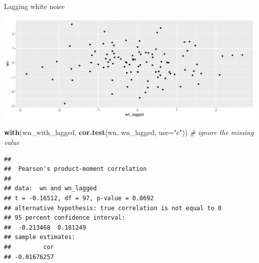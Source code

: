 \documentclass[
  ignorenonframetext,
]{beamer}
\newenvironment{Shaded}{\begin{snugshade}}{\end{snugshade}}
\newcommand{\CommentTok}[1]{\textcolor[rgb]{0.56,0.35,0.01}{\textit{#1}}}
\newcommand{\DataTypeTok}[1]{\textcolor[rgb]{0.13,0.29,0.53}{#1}}
\newcommand{\KeywordTok}[1]{\textcolor[rgb]{0.13,0.29,0.53}{\textbf{#1}}}
\newcommand{\NormalTok}[1]{#1}
\newcommand{\OperatorTok}[1]{\textcolor[rgb]{0.81,0.36,0.00}{\textbf{#1}}}
\newcommand{\StringTok}[1]{\textcolor[rgb]{0.31,0.60,0.02}{#1}}
\begin{document}
\begin{frame}[fragile]{Lagging white noise}
\protect\hypertarget{lagging-white-noise}{}

\begin{Shaded}
\end{Shaded}

\includegraphics{slides_d29_files/figure-beamer/unnamed-chunk-535-1.pdf}

\begin{Shaded}
\begin{Highlighting}[]
\KeywordTok{with}\NormalTok{(wn_with_lagged, }\KeywordTok{cor.test}\NormalTok{(wn, wn_lagged, }\DataTypeTok{use=}\StringTok{"c"}\NormalTok{)) }\CommentTok{# ignore the missing value}
\end{Highlighting}
\end{Shaded}

\begin{verbatim}
## 
##  Pearson's product-moment correlation
## 
## data:  wn and wn_lagged
## t = -0.16512, df = 97, p-value = 0.8692
## alternative hypothesis: true correlation is not equal to 0
## 95 percent confidence interval:
##  -0.213468  0.181249
## sample estimates:
##         cor 
## -0.01676257
\end{verbatim}

\end{frame}
\end{document}
